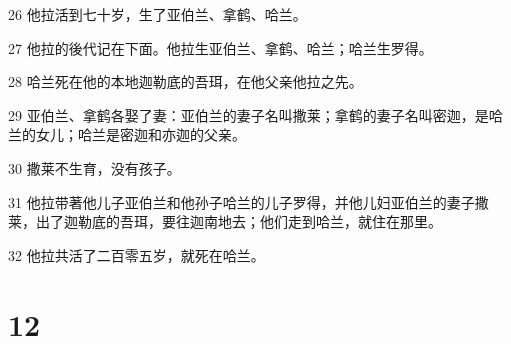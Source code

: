 \par 26 他拉活到七十岁，生了亚伯兰、拿鹤、哈兰。
\par 27 他拉的後代记在下面。他拉生亚伯兰、拿鹤、哈兰；哈兰生罗得。
\par 28 哈兰死在他的本地迦勒底的吾珥，在他父亲他拉之先。
\par 29 亚伯兰、拿鹤各娶了妻：亚伯兰的妻子名叫撒莱；拿鹤的妻子名叫密迦，是哈兰的女儿；哈兰是密迦和亦迦的父亲。
\par 30 撒莱不生育，没有孩子。
\par 31 他拉带著他儿子亚伯兰和他孙子哈兰的儿子罗得，并他儿妇亚伯兰的妻子撒莱，出了迦勒底的吾珥，要往迦南地去；他们走到哈兰，就住在那里。
\par 32 他拉共活了二百零五岁，就死在哈兰。

\chapter{12}

